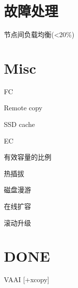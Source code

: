 \section{故障处理}

\begin{compactenum}
    \item {}
    \item 节点间负载均衡(<20\%)
\end{compactenum}

\section{Misc}

\begin{tcolorbox}
\begin{compactitem}
    \item FC
    \item Remote copy
    \item SSD cache
    \item EC
    \item 有效容量的比例
    \item 热插拔
    \item 磁盘漫游
    \item 在线扩容
    \item 滚动升级
\end{compactitem}
\end{tcolorbox}

\section{DONE}

\begin{compactenum}
    \item VAAI [+xcopy]
\end{compactenum}
